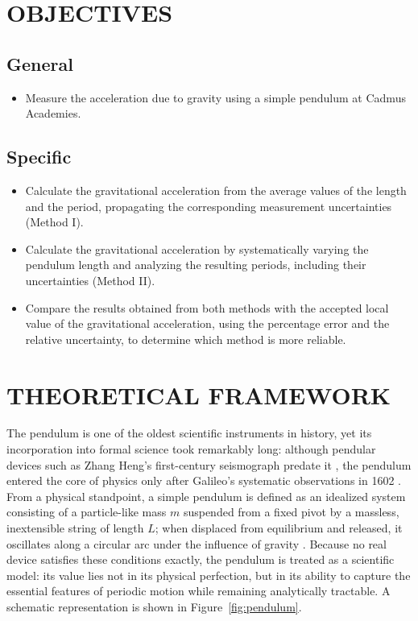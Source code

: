 \documentclass[11pt,a4paper]{article}
\begin{document}
\section{OBJECTIVES}

\subsection{General}
\begin{itemize}
  \item Measure the acceleration due to gravity using a simple pendulum at Cadmus Academies.
\end{itemize}

\subsection{Specific}
\begin{itemize}
  \item Calculate the gravitational acceleration from the average values of
        the length and the period, propagating the corresponding measurement
        uncertainties (Method I).
  \item Calculate the gravitational acceleration by systematically varying
        the pendulum length and analyzing the resulting periods, including
        their uncertainties (Method II).
  \item Compare the results obtained from both methods with the accepted
        local value of the gravitational acceleration, using the percentage
        error and the relative uncertainty, to determine which method is
        more reliable.
\end{itemize}


\section{THEORETICAL FRAMEWORK}

The pendulum is one of the oldest scientific instruments in history, yet
its incorporation into formal science took remarkably long: although
pendular devices such as Zhang Heng's first-century seismograph predate it
\citep{ferreira2026historia}, the pendulum entered the core of physics
only after Galileo's systematic observations in 1602
\citep{baker2002pendulum}. From a physical standpoint, a simple pendulum
is defined as an idealized system consisting of a particle-like mass $m$
suspended from a fixed pivot by a massless, inextensible string of length
$L$; when displaced from equilibrium and released, it oscillates along a
circular arc under the influence of gravity \citep{serway2013physics}.
Because no real device satisfies these conditions exactly, the pendulum is
treated as a scientific model: its value lies not in its physical
perfection, but in its ability to capture the essential features of
periodic motion while remaining analytically tractable. A schematic
representation is shown in Figure~\ref{fig:pendulum}.
\end{document}
